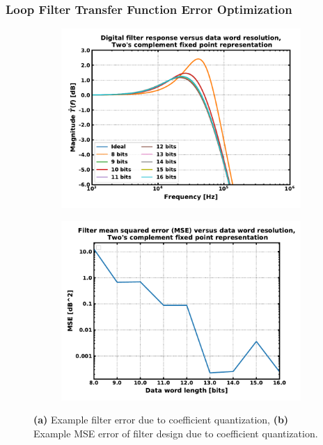 \subsubsection{Loop Filter Transfer Function Error Optimization}

\begin{figure}[htb!]
    \centering
    \begin{subfigure}{0.5\textwidth}
        \centering
        \includegraphics[width=1\textwidth, angle=0]{figs/tf_quant_error.pdf}
        \caption{ }
        \label{fig:tf_curves_quant_error}
    \end{subfigure}%
    \begin{subfigure}{0.5\textwidth}
        \centering
        \includegraphics[width=1\textwidth, angle=0]{figs/tf_mse.pdf}
        \caption{ }
        \label{fig:tf_mse}
    \end{subfigure}
    \label{fig:tf_quant_error}
    \caption{\textbf{(a)} Example filter error due to coefficient quantization, \textbf{(b)} Example MSE error of filter design due to coefficient quantization.}
\end{figure}
\FloatBarrier






